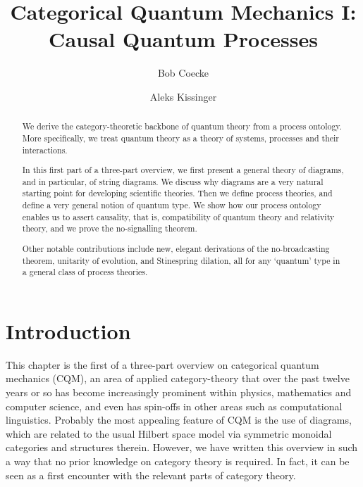 \documentclass[10pt]{article}
\title{Categorical Quantum Mechanics I:\\  Causal Quantum Processes}
\author[1]{Bob Coecke}
\author[2]{Aleks Kissinger}
\date{}
\affil[1]{Department of Computer Science, Oxford. {\tt coecke@cs.ox.ac.uk}}
\affil[2]{iCIS, Radboud University, Nijmegen. {\tt aleks@cs.ru.nl}}
\begin{document}
     

\maketitle

\begin{abstract}
We derive the category-theoretic backbone of quantum theory  from a process  ontology. More specifically, we treat quantum theory as a theory of systems, processes and their interactions. %

In this first part of a three-part overview, we first present a general theory of diagrams, and in particular, of string diagrams.  We discuss why diagrams are a very natural starting point for developing scientific theories.  Then we define process theories, and define a very general notion of quantum type. We show how our process  ontology  enables us to assert causality, that is, compatibility of quantum theory and relativity theory, and we prove the no-signalling theorem.   

Other notable contributions include new, elegant derivations of the no-broadcasting theorem, unitarity of evolution, and Stinespring dilation, all for any `quantum' type in a general class of process theories.        
\end{abstract}    

\section{Introduction}    

This chapter is the first  of a three-part  overview  on categorical quantum mechanics (CQM), an area of applied category-theory that over the past twelve years or so has become increasingly prominent within physics, mathematics and computer science, and even has spin-offs in other areas such as computational linguistics. Probably the most appealing feature of CQM is the use of diagrams, which are related to the usual Hilbert space model via symmetric monoidal categories and structures therein.  However, we have written this overview in such a way that no prior knowledge on category theory is required. In fact,  it can be seen as a first encounter with the relevant parts of category theory.      
\end{document}
